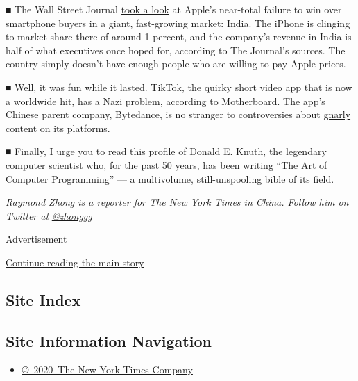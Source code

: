 ■ The Wall Street Journal
\href{https://www.wsj.com/articles/its-been-a-rout-apple-stumbles-in-worlds-largest-untapped-market-11545146399}{took
a look} at Apple's near-total failure to win over smartphone buyers in a
giant, fast-growing market: India. The iPhone is clinging to market
share there of around 1 percent, and the company's revenue in India is
half of what executives once hoped for, according to The Journal's
sources. The country simply doesn't have enough people who are willing
to pay Apple prices.

■ Well, it was fun while it lasted. TikTok,
\href{https://www.nytimes.com/2018/12/03/technology/tiktok-a-chinese-video-app-brings-fun-back-to-social-media.html}{the
quirky short video app} that is now
\href{https://www.nytimes.com/2018/10/29/technology/bytedance-app-funding-china.html}{a
worldwide hit}, has
\href{https://motherboard.vice.com/en_us/article/yw74gy/tiktok-neo-nazis-white-supremacy}{a
Nazi problem}, according to Motherboard. The app's Chinese parent
company, Bytedance, is no stranger to controversies about
\href{https://www.nytimes.com/2018/01/02/business/china-toutiao-censorship.html}{gnarly
content on its platforms}.

■ Finally, I urge you to read this
\href{https://www.nytimes.com/2018/12/17/science/donald-knuth-computers-algorithms-programming.html}{profile
of Donald E. Knuth}, the legendary computer scientist who, for the past
50 years, has been writing ``The Art of Computer Programming'' --- a
multivolume, still-unspooling bible of its field.

\emph{Raymond Zhong is a reporter for The New York Times in China.
Follow him on Twitter at}
\href{https://twitter.com/zhonggg}{\emph{@zhonggg}}

Advertisement

\protect\hyperlink{after-bottom}{Continue reading the main story}

\hypertarget{site-index}{%
\subsection{Site Index}\label{site-index}}

\hypertarget{site-information-navigation}{%
\subsection{Site Information
Navigation}\label{site-information-navigation}}

\begin{itemize}
\tightlist
\item
  \href{https://help.nytimes.com/hc/en-us/articles/115014792127-Copyright-notice}{©~2020~The
  New York Times Company}
\end{itemize}

